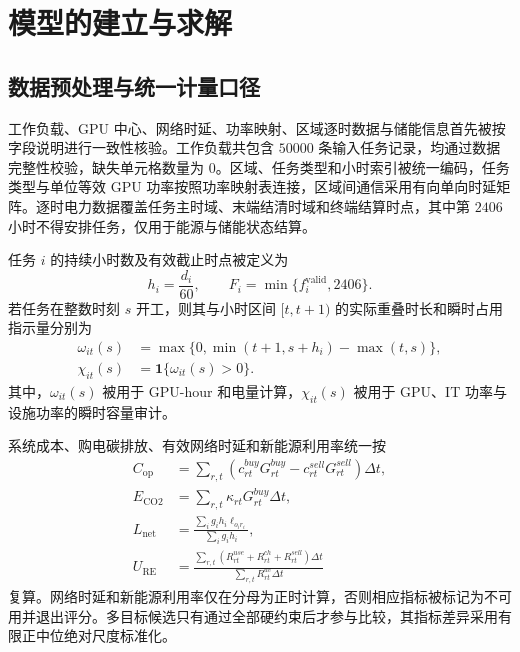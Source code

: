 \section{模型的建立与求解}

\subsection{数据预处理与统一计量口径}

工作负载、GPU 中心、网络时延、功率映射、区域逐时数据与储能信息首先被按字段说明进行一致性核验。工作负载共包含 $50000$ 条输入任务记录，均通过数据完整性校验，缺失单元格数量为 $0$。区域、任务类型和小时索引被统一编码，任务类型与单位等效 GPU 功率按照功率映射表连接，区域间通信采用有向单向时延矩阵。逐时电力数据覆盖任务主时域、末端结清时域和终端结算时点，其中第 $2406$ 小时不得安排任务，仅用于能源与储能状态结算。

任务 $i$ 的持续小时数及有效截止时点被定义为
\begin{equation}
h_i=\frac{d_i}{60},\qquad F_i=\min\{f_i^{\mathrm{valid}},2406\}.
\label{eq:duration_deadline}
\end{equation}
若任务在整数时刻 $s$ 开工，则其与小时区间 $[t,t+1)$ 的实际重叠时长和瞬时占用指示量分别为
\begin{align}
\omega_{it}(s)&=\max\{0,\min(t+1,s+h_i)-\max(t,s)\},\\
\chi_{it}(s)&=\mathbf 1\{\omega_{it}(s)>0\}.
\end{align}
其中，$\omega_{it}(s)$ 被用于 GPU-hour 和电量计算，$\chi_{it}(s)$ 被用于 GPU、IT 功率与设施功率的瞬时容量审计。

系统成本、购电碳排放、有效网络时延和新能源利用率统一按
\begin{align}
C_{\mathrm{op}}
&=\sum_{r,t}\left(c_{rt}^{buy}G_{rt}^{buy}
-c_{rt}^{sell}G_{rt}^{sell}\right)\Delta t,\\
E_{\mathrm{CO2}}
&=\sum_{r,t}\kappa_{rt}G_{rt}^{buy}\Delta t,\\
L_{\mathrm{net}}
&=\frac{\sum_i g_ih_i\ell_{o_ir_i}}{\sum_i g_ih_i},\\
U_{\mathrm{RE}}
&=\frac{\sum_{r,t}(R_{rt}^{use}+R_{rt}^{ch}+R_{rt}^{sell})\Delta t}
{\sum_{r,t}R_{rt}^{av}\Delta t}
\end{align}
复算。网络时延和新能源利用率仅在分母为正时计算，否则相应指标被标记为不可用并退出评分。多目标候选只有通过全部硬约束后才参与比较，其指标差异采用有限正中位绝对尺度标准化\cite{huber1964robust,miettinen1999nonlinear}。

